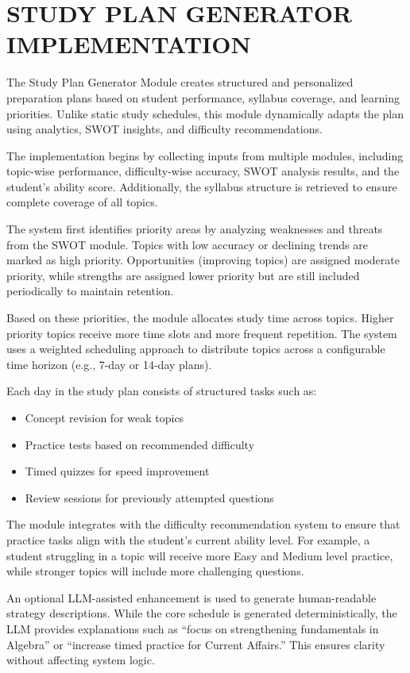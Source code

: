 \begin{sloppypar}
\section{\MakeUppercase{STUDY PLAN GENERATOR IMPLEMENTATION}}

The Study Plan Generator Module creates structured and personalized preparation plans based on student performance, syllabus coverage, and learning priorities. Unlike static study schedules, this module dynamically adapts the plan using analytics, SWOT insights, and difficulty recommendations.

The implementation begins by collecting inputs from multiple modules, including topic-wise performance, difficulty-wise accuracy, SWOT analysis results, and the student's ability score. Additionally, the syllabus structure is retrieved to ensure complete coverage of all topics.

The system first identifies priority areas by analyzing weaknesses and threats from the SWOT module. Topics with low accuracy or declining trends are marked as high priority. Opportunities (improving topics) are assigned moderate priority, while strengths are assigned lower priority but are still included periodically to maintain retention.

Based on these priorities, the module allocates study time across topics. Higher priority topics receive more time slots and more frequent repetition. The system uses a weighted scheduling approach to distribute topics across a configurable time horizon (e.g., 7-day or 14-day plans).

Each day in the study plan consists of structured tasks such as:

\begin{itemize}
\item Concept revision for weak topics
\item Practice tests based on recommended difficulty
\item Timed quizzes for speed improvement
\item Review sessions for previously attempted questions
\end{itemize}

The module integrates with the difficulty recommendation system to ensure that practice tasks align with the student's current ability level. For example, a student struggling in a topic will receive more Easy and Medium level practice, while stronger topics will include more challenging questions.

An optional LLM-assisted enhancement is used to generate human-readable strategy descriptions. While the core schedule is generated deterministically, the LLM provides explanations such as ``focus on strengthening fundamentals in Algebra'' or ``increase timed practice for Current Affairs.'' This ensures clarity without affecting system logic.


\end{sloppypar}
